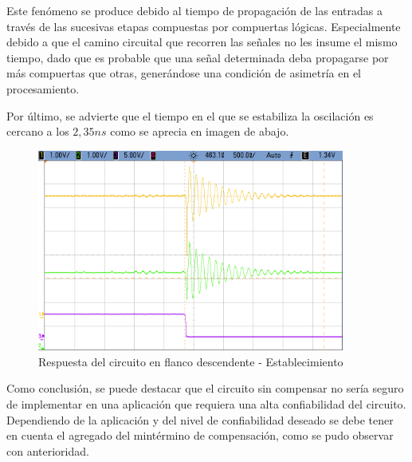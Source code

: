 Este fen\'omeno se produce debido al tiempo de propagaci\'on de las entradas a trav\'es de las sucesivas etapas compuestas por compuertas l\'ogicas. Especialmente debido a que el camino circuital que recorren las se\~nales no les insume el mismo tiempo,  dado que es probable que una se\~nal determinada deba propagarse por m\'as compuertas que otras, gener\'andose una condici\'on de asimetr\'ia en el procesamiento. 

Por \'ultimo, se advierte que el tiempo en el que se estabiliza la oscilaci\'on es cercano a los $2,35ns$ como se aprecia en imagen de abajo.

\begin{figure}[H]
    \centering
    \includegraphics[width=0.9\textwidth]{../EJ3/Recursos/cropped_EJ3_negative_slope_response_zout.png}
	\caption{Respuesta del circuito en flanco descendente - Establecimiento}
   	\label{fig:EJ3_negative_slope_response_zout}
\end{figure}


Como conclusi\'on, se puede destacar que el circuito sin compensar no ser\'ia seguro de implementar en una aplicaci\'on que requiera una alta confiabilidad del circuito. Dependiendo de la aplicaci\'on y del nivel de confiabilidad deseado se debe tener en cuenta el agregado del mint\'ermino de compensaci\'on, como se pudo observar con anterioridad.





